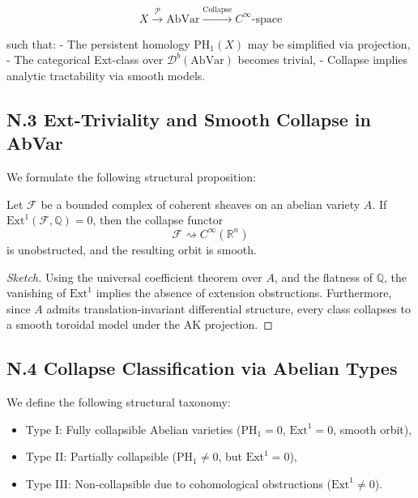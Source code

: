 \documentclass[11pt]{article}
\begin{document}
\begin{axiom}
\begin{axiom}
{{\[
X \xrightarrow{\mathcal{P}} \mathrm{AbVar} \xrightarrow{\text{Collapse}} C^\infty\text{-space}
\]

such that:
- The persistent homology \( \mathrm{PH}_1(X) \) may be simplified via projection,
- The categorical Ext-class over \( \mathcal{D}^b(\mathrm{AbVar}) \) becomes trivial,
- Collapse implies analytic tractability via smooth models.

\subsection*{N.3 Ext-Triviality and Smooth Collapse in AbVar}

We formulate the following structural proposition:

\begin{proposition}
Let \( \mathcal{F} \) be a bounded complex of coherent sheaves on an abelian variety \( A \).  
If \( \mathrm{Ext}^1(\mathcal{F}, \mathbb{Q}) = 0 \), then the collapse functor
\[
\mathcal{F} \rightsquigarrow C^\infty(\mathbb{R}^n)
\]
is unobstructed, and the resulting orbit is smooth.
\end{proposition}

\begin{proof}[Sketch]
Using the universal coefficient theorem over \( A \), and the flatness of \( \mathbb{Q} \), the vanishing of \( \mathrm{Ext}^1 \) implies the absence of extension obstructions.  
Furthermore, since \( A \) admits translation-invariant differential structure, every class collapses to a smooth toroidal model under the AK projection.
\end{proof}

\subsection*{N.4 Collapse Classification via Abelian Types}

We define the following structural taxonomy:

\begin{itemize}
  \item Type I: Fully collapsible Abelian varieties (\( \mathrm{PH}_1 = 0 \), \( \mathrm{Ext}^1 = 0 \), smooth orbit),
  \item Type II: Partially collapsible (\( \mathrm{PH}_1 \neq 0 \), but \( \mathrm{Ext}^1 = 0 \)),
  \item Type III: Non-collapsible due to cohomological obstructions (\( \mathrm{Ext}^1 \neq 0 \)).
\end{itemize}

}}
\end{axiom}
\end{axiom}
\end{document}
